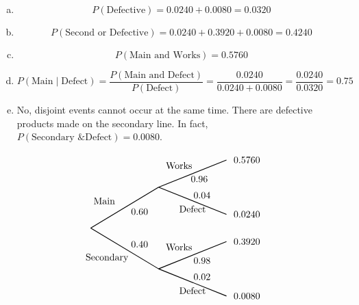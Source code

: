 \documentclass[11pt,letterpaper]{article}
\begin{document}
\sol 
\begin{enumerate}[(a)]
\item 
	\[
	P(\text{Defective})= 0.0240 + 0.0080= 0.0320
	\]

\item 
	\[
	P(\text{Second or Defective})= 0.0240 + 0.3920 + 0.0080= 0.4240
	\]

\item 
	\[
	P(\text{Main and Works})= 0.5760
	\]

\item 
	\[
	P(\text{Main} \;|\; \text{Defect})= \dfrac{P(\text{Main and Defect})}{P(\text{Defect})}= \dfrac{0.0240}{0.0240 + 0.0080}= \dfrac{0.0240}{0.0320}= 0.75
	\]

\item No, disjoint events cannot occur at the same time. There are defective products made on the secondary line. In fact, $P(\text{Secondary \& Defect})= 0.0080$. 
\end{enumerate}

		\[
		\begin{tikzpicture}[scale= 1.0]
		\def\FirstUpLabel{Main}
		\def\FirstDownLabel{Secondary}
		\def\SecondUpLabel{Works}
		\def\SecondDownLabel{Defect}
		\def\Up{$0.60$}
		\def\Down{$0.40$}
		\def\UpUp{$0.96$}
		\def\UpDown{$0.04$}
		\def\DownUp{$0.98$}
		\def\DownDown{$0.02$}
		\def\first{$0.5760$}
		\def\second{$0.0240$}
		\def\third{$0.3920$}
		\def\fourth{$0.0080$}
		
		\node at (0.5,1) {\FirstUpLabel};	
		\node at (0.6,-1.1) {\FirstDownLabel};	
		\node at (1.8,0.6) {\Up};
		\node at (1.8,-0.6) {\Down};
		\draw[thick] (0,0) -- (2.5,1.5);
		\draw[thick] (0,0) -- (2.5,-1.5);
		
		\node at (3.25,2.3) {\SecondUpLabel};
		\node at (3.75,0.7) {\SecondDownLabel};
		\node at (4,1.8) {\UpUp};
		\node at (4.1,1.2) {\UpDown};
		\node at (5.75,2.5) {\first};
		\node at (5.75,0.5) {\second};
		\draw[thick] (2.5,1.5) -- (5,2.5);
		\draw[thick] (2.5,1.5) -- (5,0.5);

		\node at (3.25,-0.7) {\SecondUpLabel};
		\node at (3.75,-2.3) {\SecondDownLabel};
		\node at (4.1,-1.2) {\DownUp};
		\node at (4.1,-1.8) {\DownDown};
		\node at (5.75,-0.5) {\third};	
		\node at (5.75,-2.5) {\fourth};	
		\draw[thick] (2.5,-1.5) -- (5,-0.5);
		\draw[thick] (2.5,-1.5) -- (5,-2.5);
		\end{tikzpicture}
		\]
\end{document}
